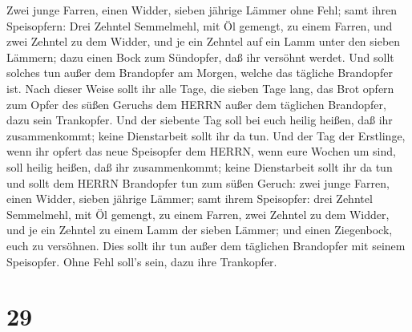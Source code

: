 Zwei junge Farren, einen Widder, sieben jährige Lämmer ohne Fehl;
 samt ihren Speisopfern: Drei Zehntel Semmelmehl, mit Öl
gemengt, zu einem Farren, und zwei Zehntel zu dem Widder, 
und je ein Zehntel auf ein Lamm unter den sieben Lämmern; 
dazu einen Bock zum Sündopfer, daß ihr versöhnt werdet. 
Und sollt solches tun außer dem Brandopfer am Morgen, welche das
tägliche Brandopfer ist.  Nach dieser Weise sollt ihr alle
Tage, die sieben Tage lang, das Brot opfern zum Opfer des süßen Geruchs
dem HERRN außer dem täglichen Brandopfer, dazu sein Trankopfer.
 Und der siebente Tag soll bei euch heilig heißen, daß ihr
zusammenkommt; keine Dienstarbeit sollt ihr da tun.  Und
der Tag der Erstlinge, wenn ihr opfert das neue Speisopfer dem HERRN,
wenn eure Wochen um sind, soll heilig heißen, daß ihr zusammenkommt;
keine Dienstarbeit sollt ihr da tun  und sollt dem HERRN
Brandopfer tun zum süßen Geruch: zwei junge Farren, einen Widder, sieben
jährige Lämmer;  samt ihrem Speisopfer: drei Zehntel
Semmelmehl, mit Öl gemengt, zu einem Farren, zwei Zehntel zu dem Widder,
 und je ein Zehntel zu einem Lamm der sieben Lämmer;
 und einen Ziegenbock, euch zu versöhnen. 
Dies sollt ihr tun außer dem täglichen Brandopfer mit seinem Speisopfer.
Ohne Fehl soll's sein, dazu ihre Trankopfer.

\hypertarget{section-28}{%
\section{29}\label{section-28}}

